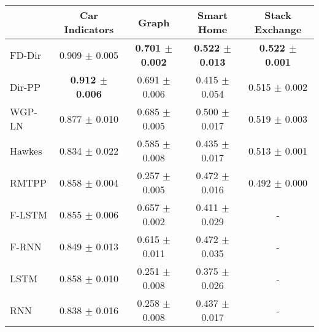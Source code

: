 \begin{tabular}{lcccc}
\toprule
{} &     Car Indicators &              Graph &         Smart Home &     Stack Exchange \\
\midrule
FD-Dir &  0.909 $\pm$ 0.005 &  \textbf{0.701 $\pm$ 0.002} &  \textbf{0.522 $\pm$ 0.013} &  \textbf{0.522 $\pm$ 0.001} \\
Dir-PP &  \textbf{0.912 $\pm$ 0.006} &  0.691 $\pm$ 0.006 &  0.415 $\pm$ 0.054 &  0.515 $\pm$ 0.002 \\
WGP-LN &  0.877 $\pm$ 0.010 &  0.685 $\pm$ 0.005 &  0.500 $\pm$ 0.017 &  0.519 $\pm$ 0.003 \\
\midrule
Hawkes &  0.834 $\pm$ 0.022 &  0.585 $\pm$ 0.008 &  0.435 $\pm$ 0.017 &  0.513 $\pm$ 0.001 \\
RMTPP  &  0.858 $\pm$ 0.004 &  0.257 $\pm$ 0.005 &  0.472 $\pm$ 0.016 &  0.492 $\pm$ 0.000 \\
F-LSTM &  0.855 $\pm$ 0.006 &  0.657 $\pm$ 0.002 &  0.411 $\pm$ 0.029 &                  - \\
F-RNN  &  0.849 $\pm$ 0.013 &  0.615 $\pm$ 0.011 &  0.472 $\pm$ 0.035 &                  - \\
LSTM   &  0.858 $\pm$ 0.010 &  0.251 $\pm$ 0.008 &  0.375 $\pm$ 0.026 &                  - \\
RNN    &  0.838 $\pm$ 0.016 &  0.258 $\pm$ 0.008 &  0.437 $\pm$ 0.017 &                  - \\
\bottomrule
\end{tabular}
